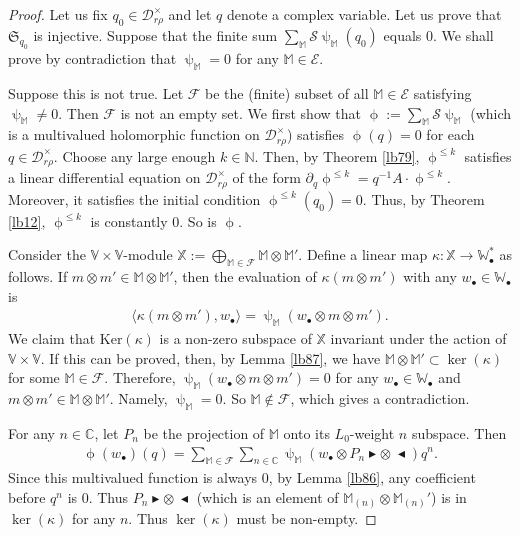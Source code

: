 \documentclass[12pt,b5paper,notitlepage]{report}
\theoremstyle{definition}
\theoremstyle{plain}
\newcommand{\fk}{\mathfrak}
\newcommand{\mc}{\mathcal}
\newcommand{\bk}[1]{\langle {#1}\rangle}
\newcommand{\mbb}{\mathbb}
\newcommand{\blt}{\bullet}
\newcommand{\Vbb}{\mathbb V}
\newcommand{\Wbb}{\mathbb W}
\newcommand{\Mbb}{\mathbb M}
\newcommand{\Cbb}{\mathbb C}
\newcommand{\Nbb}{\mathbb N}
\newcommand{\btl}{\blacktriangleleft}
\newcommand{\btr}{\blacktriangleright}
\newcommand{\Ker}{\mathrm{Ker}}
\numberwithin{equation}{section}
\begin{document}
\begin{proof}
Let us fix $q_0\in\mc D_{r\rho}^\times$ and let $q$ denote a complex variable. Let us prove that $\fk S_{q_0}$ is injective. Suppose that the finite sum $\sum_\Mbb\mc S\uppsi_\Mbb(q_0)$ equals $0$. We shall prove by contradiction that $\uppsi_\Mbb=0$ for any $\Mbb\in\mc E$. 

Suppose this is not true. Let $\mc F$ be the (finite) subset of all $\Mbb\in\mc E$ satisfying $\uppsi_\Mbb\neq0$. Then $\mc F$ is not an empty set. We first show that $\upphi:=\sum_\Mbb\mc S\uppsi_\Mbb$ (which is a multivalued holomorphic function on $\mc D_{r\rho}^\times$) satisfies $\upphi(q)=0$ for each $q\in\mc D_{r\rho}^\times$. Choose any large enough  $k\in\Nbb$. Then, by Theorem \ref{lb79},  $\upphi^{\leq k}$ satisfies a linear differential equation on $\mc D_{r\rho}^\times$ of the form $\partial_q\upphi^{\leq k}=q^{-1}A\cdot \upphi^{\leq k}$. Moreover, it satisfies the initial condition $\upphi^{\leq k}(q_0)=0$. Thus, by Theorem \ref{lb12}, $\upphi^{\leq k}$ is constantly $0$. So is $\upphi$.

Consider the $\Vbb\times\Vbb$-module $\mbb X:=\bigoplus_{\Mbb\in\mc F}\Mbb\otimes\Mbb'$. Define a linear map $\kappa:\mbb X\rightarrow \Wbb_\blt^*$ as follows. If $m\otimes m'\in\Mbb\otimes\Mbb'$, then the evaluation of $\kappa(m\otimes m')$ with any $w_\blt\in\Wbb_\blt$ is
\begin{align*}
\bk{\kappa(m\otimes m'),w_\blt}=\uppsi_\Mbb(w_\blt\otimes m\otimes m').
\end{align*}
We claim that $\Ker(\kappa)$ is a non-zero subspace of $\mbb X$ invariant under the action of $\Vbb\times \Vbb$. If this can be proved, then, by Lemma \ref{lb87}, we have $\Mbb\otimes\Mbb'\subset \ker(\kappa)$ for some $\Mbb\in\mc F$. Therefore, $\uppsi_\Mbb(w_\blt\otimes m\otimes m')=0$ for any $w_\blt\in\Wbb_\blt$ and $m\otimes m'\in\Mbb\otimes\Mbb'$. Namely, $\uppsi_\Mbb=0$. So $\Mbb\notin\mc F$, which gives a contradiction. 

For any $n\in\Cbb$, let $P_n$ be the projection of $\Mbb$ onto its $L_0$-weight $n$ subspace. Then 
\begin{align*}
\upphi(w_\blt)(q)=\sum_{\Mbb\in\mc F}\sum_{n\in\Cbb} \uppsi_\Mbb(w_\blt\otimes P_n\btr\otimes~\btl)q^n.
\end{align*}
Since this multivalued function is always $0$, by Lemma \ref{lb86}, any coefficient before $q^n$ is $0$. Thus $P_n\btr\otimes~\btl$ (which is an element of $\Mbb_{(n)}\otimes\Mbb_{(n)}'$) is in $\ker(\kappa)$ for any $n$. Thus $\ker(\kappa)$ must be non-empty.


\end{proof}
\end{document}

